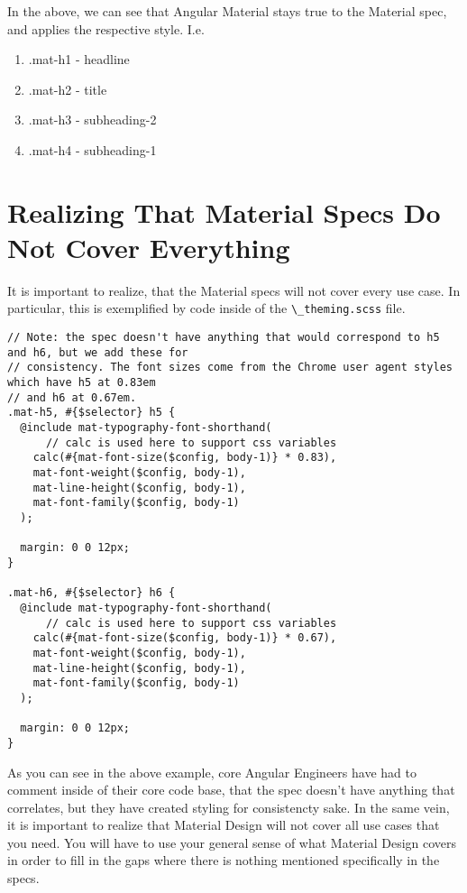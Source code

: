 In the above, we can see that Angular Material stays true to the Material
spec, and applies the respective style. I.e. 
\begin{enumerate}
  \item .mat-h1 - headline
  \item .mat-h2 - title
  \item .mat-h3 - subheading-2
  \item .mat-h4 - subheading-1
\end{enumerate}

\section{Realizing That Material Specs Do Not Cover Everything}
It is important to realize, that the Material specs will not cover
every use case. In particular, this is exemplified by code inside of 
the \lstinline{\_theming.scss} file. 

\begin{lstlisting}
// Note: the spec doesn't have anything that would correspond to h5 and h6, but we add these for
// consistency. The font sizes come from the Chrome user agent styles which have h5 at 0.83em
// and h6 at 0.67em.
.mat-h5, #{$selector} h5 {
  @include mat-typography-font-shorthand(
      // calc is used here to support css variables
    calc(#{mat-font-size($config, body-1)} * 0.83),
    mat-font-weight($config, body-1),
    mat-line-height($config, body-1),
    mat-font-family($config, body-1)
  );

  margin: 0 0 12px;
}

.mat-h6, #{$selector} h6 {
  @include mat-typography-font-shorthand(
      // calc is used here to support css variables
    calc(#{mat-font-size($config, body-1)} * 0.67),
    mat-font-weight($config, body-1),
    mat-line-height($config, body-1),
    mat-font-family($config, body-1)
  );

  margin: 0 0 12px;
}
\end{lstlisting}

As you can see in the above example, core Angular Engineers have had to comment 
inside of their core code base, that the spec doesn't have anything that 
correlates, but they have created styling for consistencty sake. In the same vein,
it is important to realize that Material Design will not cover all use cases 
that you need. You will have to use your general sense of what Material Design 
covers in order to fill in the gaps where there is nothing mentioned specifically 
in the specs. 

